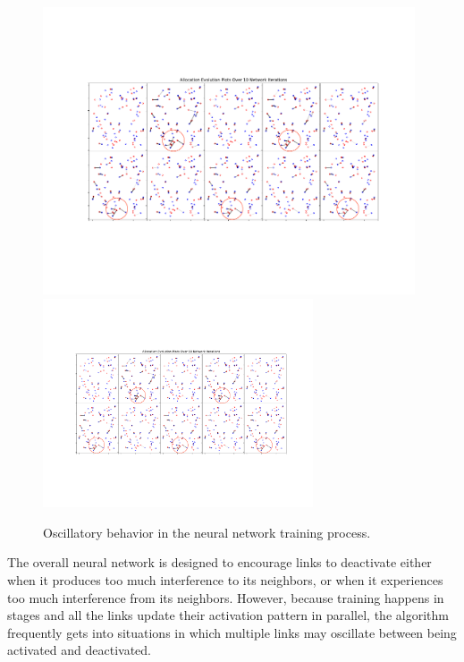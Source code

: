 \documentclass[journal,12pt,onecolumn,draftclsnofoot,]{IEEEtran}
\begin{document}
\begin{figure}[t]
        \centering
    	\ifOneColumn
            \includegraphics[width=11cm]{fig/ConvNet_LocalSymmetry2}
        \else
            \includegraphics[width=8cm]{fig/ConvNet_LocalSymmetry2}
        \fi
        \caption{Oscillatory behavior in the neural network training process.}
        \label{fig: evoSymmetry}
\end{figure}

The overall neural network is designed to encourage links to deactivate either
when it produces too much interference to its neighbors, or when it experiences
too much interference from its neighbors. However, because training happens in
stages and all the links update their activation pattern in parallel,
the algorithm frequently gets into situations in which multiple links may oscillate
between being activated and deactivated.
\end{document}
